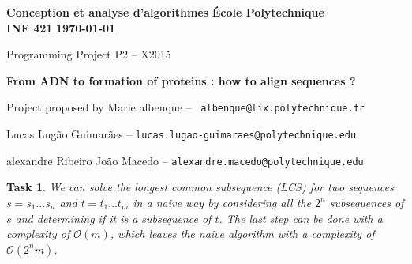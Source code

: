 \documentclass[11pt]{article} %
\theoremstyle{problemstyle}
\newtheorem{exercise}{Task}	%
\theoremstyle{problemstyle}
\renewcommand*{\O}{\mathcal{O}}
\begin{document}
\noindent
\normalsize\textbf{Conception et analyse d'algorithmes} \hfill \textbf{École Polytechnique}\\
\normalsize\textbf{INF 421} \hfill \textbf{\today}\vspace{20pt}
\centerline{\Large Programming Project P2 – X2015}\vspace{5pt}
\centerline{\Large \textbf{From ADN to formation of proteins : how to align sequences ?}}\vspace{3pt}
\centerline{Project proposed by Marie albenque -- \texttt{ albenque@lix.polytechnique.fr}}\vspace{13pt}
\centerline{Lucas Lugão Guimarães -- \texttt{lucas.lugao-guimaraes@polytechnique.edu}}
\centerline{alexandre Ribeiro João Macedo --  \texttt{alexandre.macedo@polytechnique.edu}}\vspace{20pt}


\begin{exercise} %
We can solve the longest common subsequence (LCS) for two sequences $s=s_1\dots s_n$ and $t=t_1\dots t_m$ in a naive way by considering all the $2^{n}$ subsequences of $s$ and determining if it is a subsequence of $t$. The last step can be done with a complexity of $\O(m)$, which leaves the naive algorithm with a complexity of $\O(2^{n}m)$.
\end{exercise}
\end{document}
